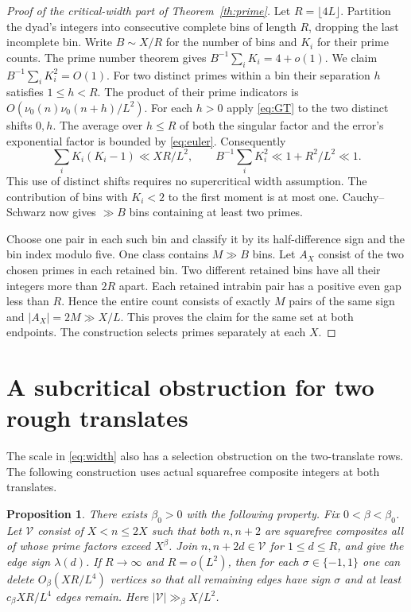 \documentclass[11pt]{article}
\newtheorem{proposition}[theorem]{Proposition}
\begin{document}
\begin{proof}[Proof of the critical-width part of Theorem~\ref{th:prime}]
Let \(R=\lfloor4L\rfloor\). Partition the dyad's integers into consecutive
complete bins of length \(R\), dropping the last incomplete bin. Write
\(B\sim X/R\) for the number of bins and \(K_i\) for their prime counts.
The prime number theorem gives \(B^{-1}\sum_iK_i=4+o(1)\).
We claim \(B^{-1}\sum_iK_i^2=O(1)\). For two distinct primes within a bin
their separation \(h\) satisfies \(1\le h<R\). The product of their prime
indicators is \(O(\nu_0(n)\nu_0(n+h)/L^2)\).
For each \(h>0\) apply \eqref{eq:GT} to the two distinct shifts \(0,h\).
The average over \(h\le R\) of both the singular factor and the error's
exponential factor is bounded by \eqref{eq:euler}. Consequently
\[
 \sum_i K_i(K_i-1)\ll XR/L^2,\qquad
 B^{-1}\sum_i K_i^2\ll 1+R^2/L^2\ll1 .
\]
This use of distinct shifts requires no supercritical width assumption.
The contribution of bins with \(K_i<2\) to the first moment is at most
one. Cauchy--Schwarz now gives \(\gg B\) bins containing at least two primes.

Choose one pair in each such bin and classify it by its half-difference
sign and the bin index modulo five. One class contains \(M\gg B\) bins.
Let \(A_X\) consist of the two chosen primes in each retained bin.
Two different retained bins have all their integers more than \(2R\)
apart. Each retained intrabin pair has a positive even gap less than \(R\).
Hence the entire count consists of exactly \(M\) pairs of the same sign
and \(|A_X|=2M\gg X/L\). This proves the claim for the same set at both
endpoints. The construction selects primes separately at each \(X\).
\end{proof}


\section{A subcritical obstruction for two rough translates}
The scale in \eqref{eq:width} also has a selection obstruction on the
two-translate rows. The following construction uses actual squarefree
composite integers at both translates.

\begin{proposition}\label{prop:roughsharp}
There exists $\beta_0>0$ with the following property. Fix
$0<\beta<\beta_0$. Let $\mathcal V$ consist of $X<n\le2X$ such that both
$n,n+2$ are squarefree composites all of whose prime factors exceed
$X^\beta$. Join $n,n+2d\in\mathcal V$ for $1\le d\le R$, and give
the edge sign $\lambda(d)$. If $R\to\infty$ and $R=o(L^2)$, then for each
$\sigma\in\{-1,1\}$ one can delete $O_\beta(XR/L^4)$ vertices so that
all remaining edges have sign $\sigma$ and at least
$c_\beta XR/L^4$ edges remain. Here $|\mathcal V|\gg_\beta X/L^2$.
\end{proposition}
\end{document}
